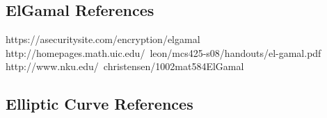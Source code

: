 \documentclass[conference]{IEEEtran}
\begin{document}
\subsection{ElGamal References}
https://asecuritysite.com/encryption/elgamal \newline
http://homepages.math.uic.edu/~leon/mcs425-s08/handouts/el-gamal.pdf \newline
http://www.nku.edu/~christensen/1002mat584ElGamal%

\subsection{Elliptic Curve References}


\end{document}
